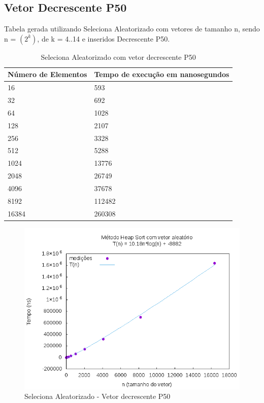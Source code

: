\documentclass[12pt,a4paper,twoside]{report}
\begin{document}
\subsection{Vetor Decrescente P50}
Tabela gerada utilizando Seleciona Aleatorizado com vetores de tamanho n, sendo n = $(2^k)$, de k = 4..14 e inseridos Decrescente P50.
\begin{table}[H]
\centering
\caption{Seleciona Aleatorizado com vetor decrescente P50}
\label{my-label}
\begin{tabular}{|l|l|}
\hline
\multicolumn{1}{|c|}{\textbf{Número de Elementos}} & \multicolumn{1}{c|}{\textbf{Tempo de execução em nanosegundos}} \\ \hline
16 & 593 \\ \hline
32 & 692 \\ \hline
64 & 1028 \\ \hline
128 & 2107 \\ \hline
256 & 3328 \\ \hline
512 & 5288 \\ \hline
1024 & 13776 \\ \hline
2048 & 26749 \\ \hline
4096 & 37678 \\ \hline
8192 & 112482 \\ \hline
16384 & 260308 \\ \hline
\end{tabular}
\end{table}

\begin{figure}[H]
    \centering
    \includegraphics[width=0.7\linewidth]{graficos/HeapSort/vIntAleatorio/vIntAleatorio.png}
  \caption{Seleciona Aleatorizado - Vetor decrescente P50}
\end{figure}

%
%
\end{document}
